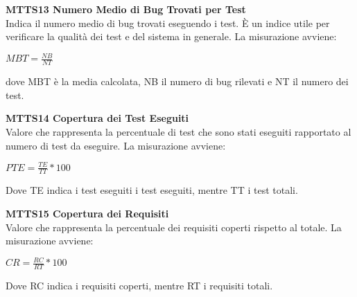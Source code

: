 \begin{itemize}
	\item \textbf{MTTS13 Numero Medio di Bug Trovati per Test}\-\\
Indica il numero medio di bug trovati eseguendo i test. È  un indice utile per verificare la qualità dei test e del sistema in generale. La misurazione avviene:
\begin{center}
	\item $MBT = \frac{NB}{NT}$
\end{center}
dove MBT è la media calcolata, NB il numero di bug rilevati e NT il numero dei test.
	\item \textbf{MTTS14 Copertura dei Test Eseguiti}\-\\
Valore che rappresenta la percentuale di test che sono stati eseguiti rapportato al numero di test da eseguire. La misurazione avviene:
\begin{center}
	\item $PTE = \frac{TE}{TT}*100$
\end{center}
Dove TE indica i test eseguiti i test eseguiti, mentre TT i test totali.
	\item \textbf{MTTS15 Copertura dei Requisiti}\-\\
Valore che rappresenta la percentuale dei requisiti coperti rispetto al totale. La misurazione avviene:
\begin{center}
	\item $CR = \frac{RC}{RT}*100$
\end{center}
Dove RC indica i requisiti coperti, mentre RT i requisiti totali.


\end{itemize}


\iffalse 
\paragraph{MTTS15 Difetti Trovati per Requisito}\-\\
Indice numerico che rappresenta il numero medio di test eseguiti per requisito. Utile per verificare che il sistema soddisfi i requisiti a pieno. La misurazione avviene:
\begin{center}
	\item $MDR = \frac{TDR}{TR}$
\end{center}
dove MDR è la media calcolata, TDR il numero totale di difetti trovati e TR il numero totale di requisiti.
\fi

